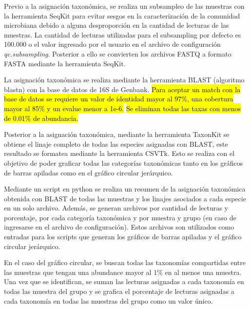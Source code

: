 Previo a la asignación taxonómica, se realiza un subsampleo de las muestras con la herramienta SeqKit para evitar sesgos en la caracterización de la comunidad microbiana debido a alguna desproporción en la cantidad de lecturas de las muestras.
La cantidad de lecturas utilizadas para el subsampling por defecto es 100.000 o el valor ingresado por el usuario en el archivo de configuración \textit{qc.subsampling}.
Posterior a ello se convierten los archivos FASTQ a formato FASTA mediante la herramienta SeqKit.

La asignación taxonómica se realiza mediante la herramienta BLAST (algoritmo blastn) con la base de datos de 16S de Genbank. 
\hl{Para aceptar un match con la base de datos se requiere un valor de identidad mayor al 97\%, una cobertura mayor al 85\% y un evalue menor a 1e-6.}
\hl{Se eliminan todas las taxas con menos de 0.01\% de abundancia.}

Posterior a la asignación taxonómica, mediante la herramienta TaxonKit se obtiene el linaje completo de todas las especies asignadas con BLAST, este resultado se formatea mediante la herramienta CSVTk. 
Esto se realiza con el objetivo de poder graficar todas las categorías taxonómicas tanto en los gráficos de barras apiladas como en el gráfico circular jerárquico.

Mediante un script en python se realiza un resumen de la asignación taxonómica obtenida con BLAST de todas las muestras y los linajes asociados a cada especie en un solo archivo. Además, se generan archivos por cantidad de lecturas y porcentaje, por cada categoría taxonómica y por muestra y grupo (en caso de ingresarse en el archivo de configuración).
Estos archivos son utilizados como entradas para los scripts que generan los gráficos de barras apiladas y  el gráfico circular jerárquico.


En el caso del gráfico circular, se buscan todas las taxonomías compartidas entre las muestras que tengan una abundance mayor al 1\% en al menos una muestra. 
Una vez que se identifican, se suman las lecturas asignadas a cada taxonomía en todas las muestra del grupo y se grafica el porcentaje de lecturas asignadas a cada taxonomía en todas las muestras del grupo como un valor único.



